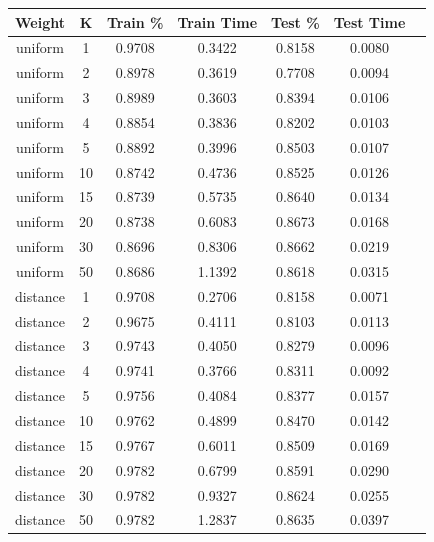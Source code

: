 \documentclass[h]{article}
\begin{document}
\begin{figure}[H]
\begin{tabular}{ | c | c  | c | c | c | c | c |} 
\hline

\textbf{Weight} & \textbf{K} & \textbf{Train \%} & \textbf{Train Time} & \textbf{Test \%} & \textbf{Test Time}   \\ \hline
uniform & 1 & 0.9708 & 0.3422 & 0.8158 & 0.0080 \\ \hline
uniform & 2 & 0.8978 & 0.3619 & 0.7708 & 0.0094 \\ \hline
uniform & 3 & 0.8989 & 0.3603 & 0.8394 & 0.0106 \\ \hline
uniform & 4 & 0.8854 & 0.3836 & 0.8202 & 0.0103 \\ \hline
uniform & 5 & 0.8892 & 0.3996 & 0.8503 & 0.0107 \\ \hline
uniform & 10 & 0.8742 & 0.4736 & 0.8525 & 0.0126 \\ \hline
uniform & 15 & 0.8739 & 0.5735 & 0.8640 & 0.0134 \\ \hline
uniform & 20 & 0.8738 & 0.6083 & 0.8673 & 0.0168 \\ \hline
uniform & 30 & 0.8696 & 0.8306 & 0.8662 & 0.0219 \\ \hline
uniform & 50 & 0.8686 & 1.1392 & 0.8618 & 0.0315 \\ \hline
distance & 1 & 0.9708 & 0.2706 & 0.8158 & 0.0071 \\ \hline
distance & 2 & 0.9675 & 0.4111 & 0.8103 & 0.0113 \\ \hline
distance & 3 & 0.9743 & 0.4050 & 0.8279 & 0.0096 \\ \hline
distance & 4 & 0.9741 & 0.3766 & 0.8311 & 0.0092 \\ \hline
distance & 5 & 0.9756 & 0.4084 & 0.8377 & 0.0157 \\ \hline
distance & 10 & 0.9762 & 0.4899 & 0.8470 & 0.0142 \\ \hline
distance & 15 & 0.9767 & 0.6011 & 0.8509 & 0.0169 \\ \hline
distance & 20 & 0.9782 & 0.6799 & 0.8591 & 0.0290 \\ \hline
distance & 30 & 0.9782 & 0.9327 & 0.8624 & 0.0255 \\ \hline
distance & 50 & 0.9782 & 1.2837 & 0.8635 & 0.0397 \\ \hline


\end{tabular}
\end{figure}
\end{document}

